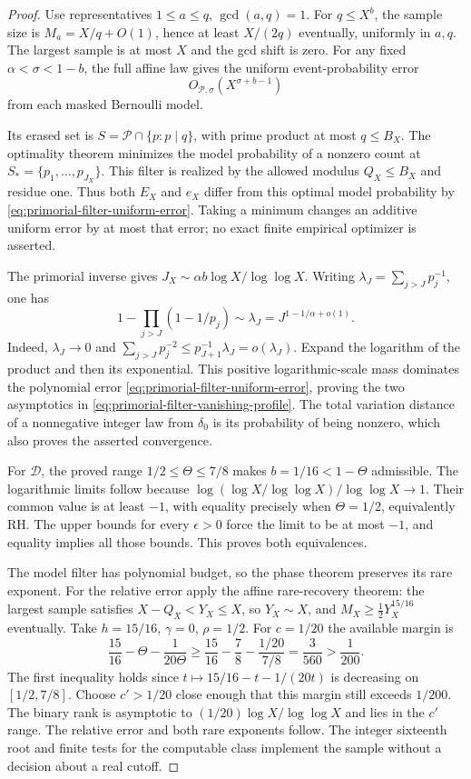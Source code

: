 \documentclass[11pt]{article}
\theoremstyle{definition}
\begin{document}
\begin{proof}
Use representatives $1\le a\le q$, $\gcd(a,q)=1$.
For $q\le X^b$, the sample size is $M_a=X/q+O(1)$,
hence at least $X/(2q)$ eventually, uniformly in $a,q$.
The largest sample is at most $X$ and the gcd shift is zero.
For any fixed $\alpha<\sigma<1-b$, the full affine law gives
the uniform event-probability error
\begin{equation}
 O_{\mathcal P,\sigma}(X^{\sigma+b-1})
 \label{eq:primorial-filter-uniform-error}
\end{equation}
from each masked Bernoulli model.

Its erased set is $S=\mathcal P\cap\{p:p\mid q\}$,
with prime product at most $q\le B_X$.
The optimality theorem minimizes the model probability
of a nonzero count at $S_*=\{p_1,\ldots,p_{J_X}\}$.
This filter is realized by the allowed modulus $Q_X\le B_X$
and residue one.
Thus both $E_X$ and $e_X$ differ from this optimal model
probability by \eqref{eq:primorial-filter-uniform-error}.
Taking a minimum changes an additive uniform error by at most
that error; no exact finite empirical optimizer is asserted.

The primorial inverse gives
$J_X\sim\alpha b\log X/\log\log X$.
Writing $\lambda_J=\sum_{j>J}p_j^{-1}$, one has
\[
 1-\prod_{j>J}(1-1/p_j)\sim\lambda_J
                         =J^{1-1/\alpha+o(1)}.
\]
Indeed, $\lambda_J\to0$ and
$\sum_{j>J}p_j^{-2}\le p_{J+1}^{-1}\lambda_J=o(\lambda_J)$.
Expand the logarithm of the product and then its exponential.
This positive logarithmic-scale mass dominates the polynomial
error \eqref{eq:primorial-filter-uniform-error}, proving the
two asymptotics in \eqref{eq:primorial-filter-vanishing-profile}.
The total variation distance of a nonnegative integer law
from $\delta_0$ is its probability of being nonzero,
which also proves the asserted convergence.

For $\mathcal D$, the proved range
$1/2\le\Theta\le7/8$ makes $b=1/16<1-\Theta$ admissible.
The logarithmic limits follow because
$\log(\log X/\log\log X)/\log\log X\to1$.
Their common value is at least $-1$, with equality precisely
when $\Theta=1/2$, equivalently RH.
The upper bounds for every $\epsilon>0$ force the limit
to be at most $-1$, and equality implies all those bounds.
This proves both equivalences.

The model filter has polynomial budget, so the phase theorem
preserves its rare exponent.
For the relative error apply the affine rare-recovery theorem:
the largest sample satisfies $X-Q_X<Y_X\le X$, so $Y_X\sim X$,
and $M_X\ge\frac12Y_X^{15/16}$ eventually.
Take $h=15/16$, $\gamma=0$, $\rho=1/2$.
For $c=1/20$ the available margin is
\[
 \frac{15}{16}-\Theta-\frac{1}{20\Theta}
 \ge\frac{15}{16}-\frac78-\frac{1/20}{7/8}
 =\frac3{560}>\frac1{200}.
\]
The first inequality holds since
$t\mapsto15/16-t-1/(20t)$ is decreasing on $[1/2,7/8]$.
Choose $c'>1/20$ close enough that this margin still
exceeds $1/200$.
The binary rank is asymptotic to
$(1/20)\log X/\log\log X$ and lies in the $c'$ range.
The relative error and both rare exponents follow.
The integer sixteenth root and finite tests for the computable
class implement the sample without a decision about a real cutoff.
\end{proof}
\end{document}
